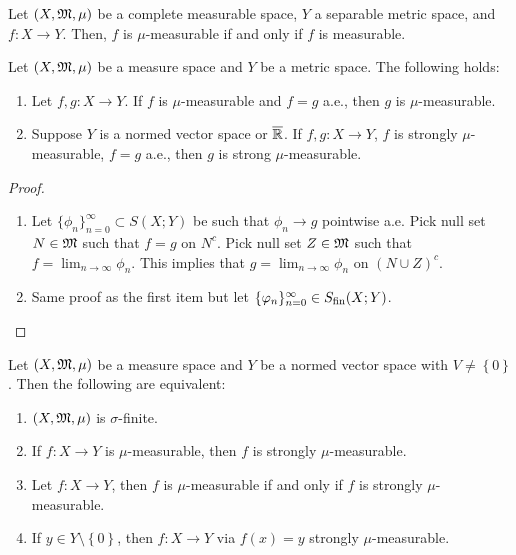 \documentclass[a4paper]{article}
\renewcommand{\seqinfn}[1]{\{ #1 \}_{n=0}^\infty}
\begin{document}
\begin{cor}
  Let $(X, \mathfrak{M}, \mu)$ be a complete measurable space,
  $Y$ a separable metric space, and $f: X \to Y$.
  Then, $f$ is $\mu$-measurable if and only if
  $f$ is measurable.
\end{cor}

\begin{prop}
  Let $(X, \mathfrak{M}, \mu)$ be a measure space and $Y$ be a metric
  space. The following holds:
  \begin{enumerate}
    \item Let $f, g: X \to Y$. If $f$ is $\mu$-measurable
    and $f = g$ a.e., then $g$ is $\mu$-measurable.

    \item Suppose $Y$ is a normed vector space or
    $\overline{\mathbb{R}}$. If $f, g: X \to Y$, $f$ is strongly
    $\mu$-measurable, $f = g$ a.e., then
    $g$ is strong $\mu$-measurable.
  \end{enumerate}
\end{prop}

\begin{proof}
  \begin{enumerate}
    \item Let $\seqinfn{\phi_n} \subset S(X; Y)$ be such that
    $\phi_n \to g$ pointwise a.e. Pick null set
    $N \in \mathfrak{M}$ such that $f = g$ on $N^c$. Pick
    null set $Z \in \mathfrak{M}$ such that $f = \lim_{n \to \infty}
    \phi_n$. This implies that
    $g = \lim_{n \to \infty} \phi_n$ on $(N \cup Z)^c$.

    \item Same proof as the first item but let
    $\seqinfn{\phi_n} \in \Sfin(X; Y)$.
  \end{enumerate}

\end{proof}

\begin{thm}
  Let $(X,\mathfrak{M}, \mu)$ be a measure space and
  $Y$ be a normed vector space with $V \neq \left\{ 0
  \right\}$. Then the following are equivalent:
  \begin{enumerate}
    \item $(X, \mathfrak{M}, \mu)$ is $\sigma$-finite.
    \item If $f: X \to Y$ is $\mu$-measurable, then
    $f$ is strongly $\mu$-measurable.
    \item Let $f: X \to Y$, then $f$ is $\mu$-measurable
    if and only if $f$ is strongly $\mu$-measurable.
    \item If $y \in Y \setminus \left\{ 0 \right\}$,
    then $f: X \to Y$ via $f(x) = y$ strongly
    $\mu$-measurable.
  \end{enumerate}
\end{thm}
\end{document}
